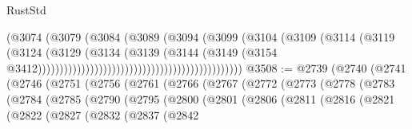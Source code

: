 \begin{lexlean}{RustStd}
\begin{coremodule}
                                                                (@3074
                                                                  (@3079
                                                                    (@3084
                                                                      (@3089
                                                                        (@3094
                                                                          (@3099
                                                                            (@3104
                                                                              (@3109
                                                                                (@3114
                                                                                  (@3119
                                                                                    (@3124
                                                                                      (@3129
                                                                                        (@3134
                                                                                          (@3139
                                                                                            (@3144
                                                                                              (@3149
                                                                                                (@3154
                                                                                                  @3412)))))))))))))))))))))))))))))))))))))))))))))))
@3508 := @2739
    (@2740
      (@2741
        (@2746
          (@2751
            (@2756
              (@2761
                (@2766
                  (@2767
                    (@2772
                      (@2773
                        (@2778
                          (@2783
                            (@2784
                              (@2785
                                (@2790
                                  (@2795
                                    (@2800
                                      (@2801
                                        (@2806
                                          (@2811
                                            (@2816
                                              (@2821
                                                (@2822
                                                  (@2827
                                                    (@2832
                                                      (@2837
                                                        (@2842

\end{coremodule}
\end{lexlean}
